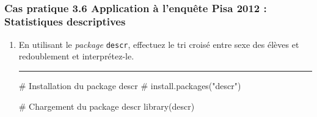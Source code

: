 \documentclass[12pt,twosided, notitlepage]{book}
\newenvironment{Shaded}{}{}
\newcommand{\KeywordTok}[1]{\textcolor[rgb]{0.00,0.00,1.00}{{#1}}}
\newcommand{\CommentTok}[1]{\textcolor[rgb]{0.00,0.50,0.00}{{#1}}}
\newcommand{\NormalTok}[1]{{#1}}
\newif \ifsol
\renewenvironment{Shaded}{\begin{snugshade}}{\end{snugshade}}
\begin{document}
~

\subsubsection{\texorpdfstring{\textbf{Cas pratique 3.6} Application à
l'enquête Pisa 2012 : Statistiques
descriptives}{Cas pratique 3.6 Application à l'enquête Pisa 2012 : Statistiques descriptives}}\label{cas-pratique-3.6-application-a-lenquete-pisa-2012-statistiques-descriptives}


\begin{enumerate}
\def\labelenumi{\alph{enumi}.}
\item
  En utilisant le \emph{package} \texttt{descr}, effectuez le tri croisé
  entre sexe des élèves et redoublement et
  interprétez-le.

  \ifsol 

  \begin{center} \rule{0.5\linewidth}{\linethickness}\end{center}

\begin{Shaded}
\begin{Highlighting}[]
\CommentTok{# Installation du package descr}
\CommentTok{# install.packages("descr")}

\CommentTok{# Chargement du package descr}
\KeywordTok{library}\NormalTok{(descr)}


\end{Highlighting}
\end{Shaded}
\end{enumerate}
\end{document}
